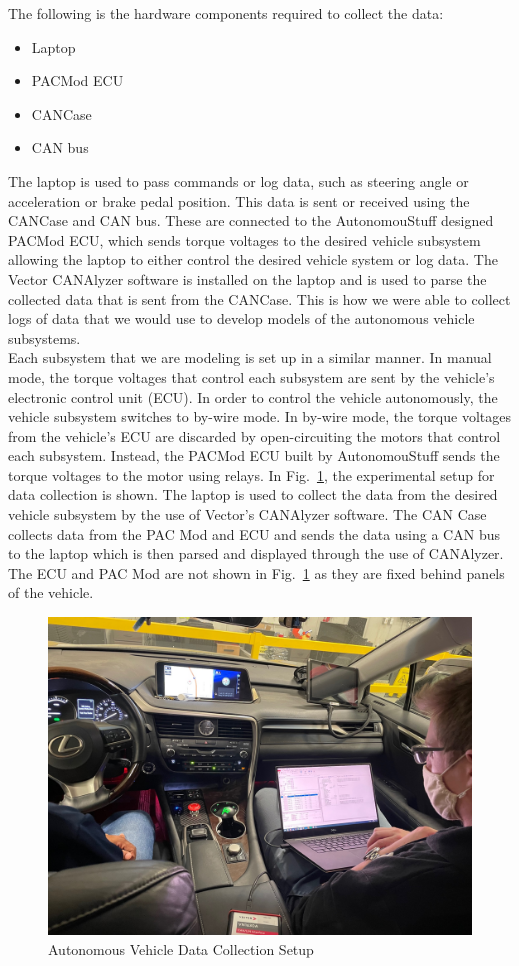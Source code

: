 \documentclass[journal,twoside,web]{ieeecolor}
\begin{document}
\noindent The following is the hardware components required to collect the data:  
	\begin{itemize}
    		\item Laptop
    		\item PACMod ECU
    		\item CANCase 
    		\item CAN bus 
 	\end{itemize}
 	
 	
\noindent The laptop is used to pass commands or log data, such as steering angle or acceleration or brake pedal position. This data is sent or received using the CANCase and CAN bus. These are connected to the AutonomouStuff designed PACMod ECU, which sends torque voltages to the desired vehicle subsystem allowing the laptop to either control the desired vehicle system or log data. The Vector CANAlyzer software is installed on the laptop and is used to parse the collected data that is sent from the CANCase. This is how we were able to collect logs of data that we would use to develop models of the autonomous vehicle subsystems.
\\

Each subsystem that we are modeling is set up in a similar manner. In manual mode, the torque voltages that control each subsystem are sent by the vehicle's electronic control unit (ECU). In order to control the vehicle autonomously, the vehicle subsystem switches to by-wire mode. In by-wire mode, the torque voltages from the vehicle's ECU are discarded by open-circuiting the motors that control each subsystem. Instead, the PACMod ECU built by AutonomouStuff sends the torque voltages to the motor using relays. In Fig.~\ref{fig:vehicleSetup}, the experimental setup for data collection is shown. The laptop is used to collect the data from the desired vehicle subsystem by the use of Vector's CANAlyzer software. The CAN Case collects data from the PAC Mod and ECU and sends the data using a CAN bus to the laptop which is then parsed and displayed through the use of CANAlyzer. The ECU and PAC Mod are not shown in Fig.~\ref{fig:vehicleSetup} as they are fixed behind panels of the vehicle. 
\\

\begin{figure}[htbp]
	\centering
    	\includegraphics[width=.48\textwidth]{figs/img/picturesVisitToAStuff/dataColletionSetup1-20211007}
    	\caption{Autonomous Vehicle Data Collection Setup}
    	\label{fig:vehicleSetup}
\end{figure}
\end{document}
